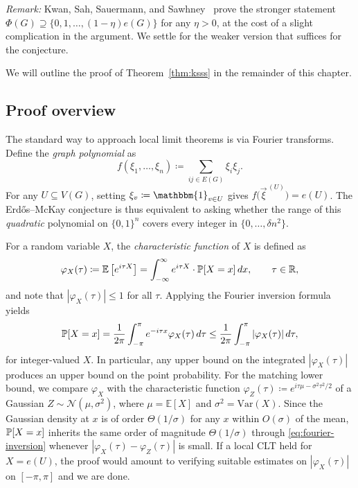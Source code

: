 \textit{Remark:} Kwan, Sah, Sauermann, and Sawhney~\cite{Kwan_2023} prove the stronger statement $\Phi(G) \supseteq \{0, 1, \ldots, (1 - \eta) e(G)\}$ for any $\eta > 0$, at the cost of a slight complication in the argument. We settle for the weaker version that suffices for the conjecture.

We will outline the proof of Theorem~\ref{thm:ksss} in the remainder of this chapter.

\subsection{Proof overview}
\label{sec:proof-overview}

The standard way to approach local limit theorems is via Fourier transforms. Define the \emph{graph polynomial} as
\[
  f(\xi_1, \ldots, \xi_n) \coloneqq \sum_{ij \in E(G)} \xi_i \xi_j.
\]
For any $U \subseteq V(G)$, setting $\xi_v \coloneqq \mathbbm{1}_{v \in U}$ gives $f\bigl(\vec{\xi}^{\,(U)}\bigr) = e(U)$. The Erd\H{o}s--McKay conjecture is thus equivalent to asking whether the range of this \textit{quadratic} polynomial on $\{0,1\}^n$ covers every integer in $\{0, \ldots, \delta n^2\}$.

For a random variable $X$, the \textit{characteristic function} of $X$ is defined as
\[
\varphi_X(\tau) \coloneqq \mathbb{E} \left[e^{i\tau X}\right] = \int_{-\infty}^{\infty} e^{i\tau X} \cdot \mathbb{P}[X = x] \, dx, \qquad \tau \in \mathbb{R},
\]
and note that $|\varphi_X(\tau)| \leq 1$ for all $\tau$. Applying the Fourier inversion formula yields
\begin{equation}
\label{eq:fourier-inversion}
\mathbb{P}[X = x] = \frac{1}{2\pi}\int_{-\pi}^{\pi} e^{-i\tau x}  \varphi_X(\tau) \, d\tau \leq \frac{1}{2\pi}\int_{-\pi}^{\pi} |\varphi_X(\tau)| \, d\tau,
\end{equation}
for integer-valued $X$. In particular, any upper bound on the integrated $|\varphi_X(\tau)|$ produces an upper bound on the point probability. For the matching lower bound, we compare $\varphi_X$ with the characteristic function $\varphi_Z(\tau) \coloneqq e^{i\tau\mu - \sigma^2\tau^2/2}$ of a Gaussian $Z \sim \mathcal{N}(\mu, \sigma^2)$, where $\mu = \mathbb{E}[X]$ and $\sigma^2 = \mathrm{Var}(X)$. Since the Gaussian density at $x$ is of order $\Theta(1/\sigma)$ for any $x$ within $O(\sigma)$ of the mean, $\mathbb{P}[X = x]$ inherits the same order of magnitude $\Theta(1/\sigma)$ through \eqref{eq:fourier-inversion} whenever $|\varphi_X(\tau) - \varphi_Z(\tau)|$ is small. If a local CLT held for $X = e(U)$, the proof would amount to verifying suitable estimates on $|\varphi_X(\tau)|$ on $[-\pi, \pi]$ and we are done.

